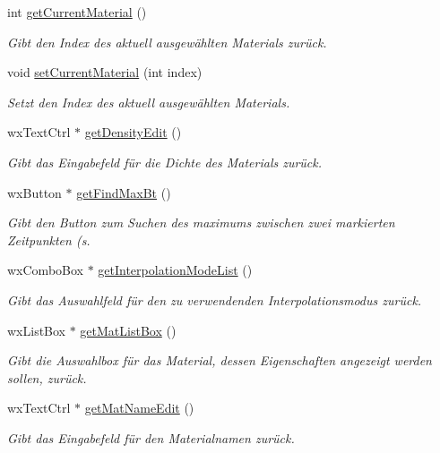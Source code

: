 \begin{DoxyCompactItemize}
int \hyperlink{classPropertiesBox_aa564b32c992a780af80378ec66b3377f}{get\-Current\-Material} ()
\begin{DoxyCompactList}\small\item\em Gibt den Index des aktuell ausgewählten Materials zurück. \end{DoxyCompactList}\item 
void \hyperlink{classPropertiesBox_a995d6f6b8f068f4db6d6543f057d3fde}{set\-Current\-Material} (int index)
\begin{DoxyCompactList}\small\item\em Setzt den Index des aktuell ausgewählten Materials. \end{DoxyCompactList}\item 
wx\-Text\-Ctrl $\ast$ \hyperlink{classPropertiesBox_a088fac7ebd80b9499a98ff3a1cc93a94}{get\-Density\-Edit} ()
\begin{DoxyCompactList}\small\item\em Gibt das Eingabefeld für die Dichte des Materials zurück. \end{DoxyCompactList}\item 
wx\-Button $\ast$ \hyperlink{classPropertiesBox_a98fdcce60c8fc8d7fea0adca8d9fe7c3}{get\-Find\-Max\-Bt} ()
\begin{DoxyCompactList}\small\item\em Gibt den Button zum Suchen des maximums zwischen zwei markierten Zeitpunkten (s. \end{DoxyCompactList}\item 
wx\-Combo\-Box $\ast$ \hyperlink{classPropertiesBox_a27b80b42d1ab9717538de23297c8a80c}{get\-Interpolation\-Mode\-List} ()
\begin{DoxyCompactList}\small\item\em Gibt das Auswahlfeld für den zu verwendenden Interpolationsmodus zurück. \end{DoxyCompactList}\item 
wx\-List\-Box $\ast$ \hyperlink{classPropertiesBox_a0fe27b9cfb280154821fda1f9eb6d59e}{get\-Mat\-List\-Box} ()
\begin{DoxyCompactList}\small\item\em Gibt die Auswahlbox für das Material, dessen Eigenschaften angezeigt werden sollen, zurück. \end{DoxyCompactList}\item 
wx\-Text\-Ctrl $\ast$ \hyperlink{classPropertiesBox_a10c51038eb2219e6465d213200adcbd1}{get\-Mat\-Name\-Edit} ()
\begin{DoxyCompactList}\small\item\em Gibt das Eingabefeld für den Materialnamen zurück. \end{DoxyCompactList}\item 

\end{DoxyCompactItemize}

